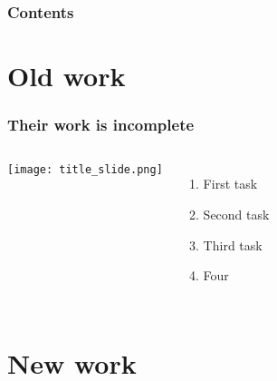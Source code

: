 \begin{frame}
    \frametitle{Contents}

    \tableofcontents

\end{frame}

\section{Old work}

\begin{frame}
    \frametitle{Their work is incomplete}

    \begin{columns}
            \centering 
            \texttt{[image: title\_slide.png]}
        

            \begin{enumerate}
                \item First task
                \item Second task
                \item Third task
                \item Four
            \end{enumerate}

    \end{columns}

\end{frame}


\section{New work}

